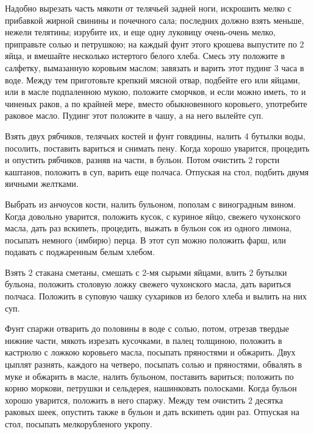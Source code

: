 
Надобно вырезать часть мякоти от телячьей задней ноги, искрошить мелко с прибавкой жирной свинины и почечного сала; последних должно взять меньше, нежели телятины; изрубите их, и еще одну луковицу очень-очень мелко, приправьте солью и петрушкою; на каждый фунт этого крошева выпустите по 2 яйца, и вмешайте несколько истертого белого хлеба. Смесь эту положите в салфетку, вымазанную коровьим маслом; завязать и варить этот пудинг 3 часа в воде. Между тем приготовьте крепкий мясной отвар, подбейте его или яйцами, или в масле подпаленною мукою, положите сморчков, и если можно иметь, то и чиненых раков, а по крайней мере, вместо обыкновенного коровьего, употребите раковое масло. Пудинг этот положите в чашу, а на него вылейте суп.


Взять двух рябчиков, телячьих костей и фунт говядины, налить 4 бутылки воды, посолить, поставить вариться и снимать пену. Когда хорошо уварится, процедить и опустить рябчиков, разняв на части, в бульон. Потом очистить 2 горсти каштанов, положить в суп, варить еще полчаса. Отпуская на стол, подбить двумя яичными желтками.


Выбрать из анчоусов кости, налить бульоном, пополам с виноградным вином. Когда довольно уварится, положить кусок, с куриное яйцо, свежего чухонского масла, дать раз вскипеть, процедить, выжать в бульон сок из одного лимона, посыпать немного (имбирю) перца. В этот суп можно положить фарш, или подавать с поджаренным белым хлебом.


Взять 2 стакана сметаны, смешать с 2-мя сырыми яйцами, влить 2 бутылки бульона, положить столовую ложку свежего чухонского масла, дать вариться полчаса. Положить в суповую чашку сухариков из белого хлеба и вылить на них суп.


Фунт спаржи отварить до половины в воде с солью, потом, отрезав твердые нижние части, мякоть изрезать кусочками, в палец толщиною, положить в кастрюлю с ложкою коровьего масла, посыпать пряностями и обжарить. Двух цыплят разнять, каждого на четверо, посыпать солью и пряностями, обвалять в муке и обжарить в масле, налить бульоном, поставить вариться; положить по корню моркови, петрушки и сельдерея, нашинковать полосками. Когда бульон хорошо уварится, положить в него спаржу. Между тем очистить 2 десятка раковых шеек, опустить также в бульон и дать вскипеть один раз. Отпуская на стол, посыпать мелкорубленого укропу.

